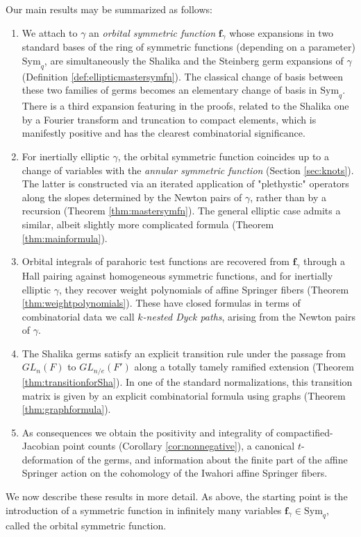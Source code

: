 \documentclass{amsart}
\numberwithin{equation}{section}
\theoremstyle{definition}
\def\Sym{{\mathrm{Sym}}}
\newcommand{\fgamma}{\mathbf{f}_{\gamma}}
\newcommand{\fl}{\mathfrak{l}}
\newcommand{\fg}{\mathfrak{g}}
\begin{document}
Our main results may be summarized as follows:
\begin{enumerate}
\item We attach to $\gamma$ an \emph{orbital symmetric function} $\fgamma$ whose expansions in two standard bases of the ring of symmetric functions (depending on a parameter) $\Sym_q$, are simultaneously the Shalika and the Steinberg germ expansions of $\gamma$ (Definition \ref{def:ellipticmastersymfn}). The classical change of basis between these two families of germs becomes an elementary change of basis in $\Sym_q$. There is a third expansion featuring in the proofs, related to the Shalika one by a Fourier transform and truncation to compact elements, which is manifestly positive and has the clearest combinatorial significance. 
\item For inertially elliptic $\gamma$, the orbital symmetric function coincides up to a change of variables with the {\em annular symmetric function} (Section \ref{sec:knots}). The latter is constructed via an iterated application of "plethystic" operators along the slopes determined by the Newton pairs of $\gamma$, rather than by a recursion (Theorem \ref{thm:mastersymfn}). The general elliptic case admits a similar, albeit slightly more complicated formula (Theorem \ref{thm:mainformula}).
\item Orbital integrals of parahoric test functions are recovered from $\fgamma$ through a Hall pairing against homogeneous symmetric functions, and for inertially elliptic $\gamma$, they recover weight polynomials of affine Springer fibers (Theorem \ref{thm:weightpolynomials}). These have closed formulas in terms of combinatorial data we call {\em $k$-nested Dyck paths}, arising from the Newton pairs of $\gamma$.
\item The Shalika germs satisfy an explicit transition rule under the passage from $GL_n(F)$ to $GL_{n/e}(F')$ along a totally tamely ramified extension (Theorem \ref{thm:transitionforSha}). 
In one of the standard normalizations, this transition matrix is given by an explicit combinatorial formula using graphs (Theorem \ref{thm:graphformula}).
\item As consequences we obtain the positivity and integrality of compactified-Jacobian point counts (Corollary \ref{cor:nonnegative}), a canonical $t$-deformation of the germs, and information about the finite part of the affine Springer action on the cohomology of the Iwahori affine Springer fibers.
\end{enumerate}
We now describe these results in more detail.
As above, the starting point is the introduction of a symmetric function in infinitely many variables $\fgamma\in \Sym_q$,
called the orbital symmetric function. %
\end{document}
